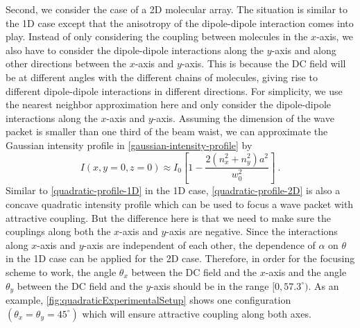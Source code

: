 Second, we consider the case of a 2D molecular array. The situation is similar to the 1D case except that the anisotropy
of the dipole-dipole interaction comes into play. Instead of only considering the coupling between molecules in 
the $x$-axis, we also have to consider the dipole-dipole interactions along the $y$-axis and along other directions
between the $x$-axis and $y$-axis. This is because the DC field will be at different angles with the different chains of 
molecules, giving rise to different dipole-dipole interactions in different directions. For simplicity, we use the
 nearest neighbor approximation here and only consider
the dipole-dipole interactions along the $x$-axis and $y$-axis. Assuming the dimension of the wave packet is
 smaller than one third of the beam waist, we can approximate the Gaussian intensity profile in
\autoref{gaussian-intensity-profile} by
\begin{equation}
I(x, y=0, z=0) \approx I_{0}\left[1- \frac{2 \left(n_x^2 + n_y^2 \right) a^2}{w_0^2}\right] \ .  \label{quadratic-profile-2D} 
\end{equation}
Similar to \autoref{quadratic-profile-1D} in the 1D case, \autoref{quadratic-profile-2D} is also a concave quadratic
 intensity profile which can be used to focus a wave packet with attractive coupling. But the difference here is
 that we need to make sure the couplings along both the $x$-axis and $y$-axis are negative. Since the interactions
 along $x$-axis and $y$-axis are independent of each other, the dependence of $\alpha$ on $\theta$ in the 1D
case can be applied for the 2D case. Therefore, in order for the focusing scheme to work, the angle $\theta_x$ 
between the DC field and the $x$-axis and the angle $\theta_y$ between the DC field and the $y$-axis should be
in the range  $[0, 57.3^{\circ})$. As an example, \autoref{fig:quadraticExperimentalSetup} shows one 
configuration $(\theta_x = \theta_y = 45^\circ)$ which will ensure attractive coupling along both axes. 



